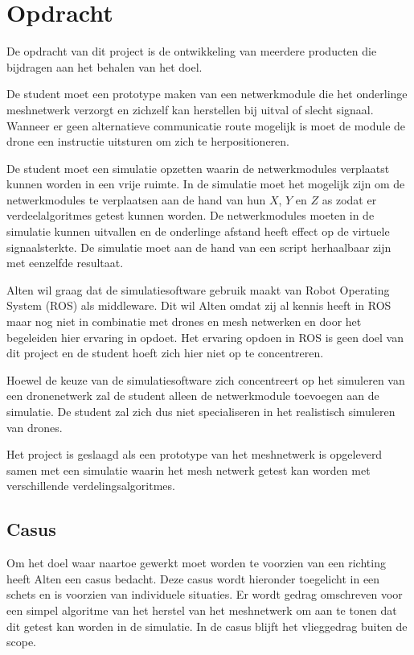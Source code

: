 \documentclass[a4paper, 11pt, oneside]{report}
\begin{document}
\section{Opdracht}\label{sec:opdracht}
De opdracht van dit project is de ontwikkeling van meerdere producten die bijdragen aan het behalen van het doel. 

De student moet een prototype maken van een netwerkmodule die het onderlinge meshnetwerk verzorgt en zichzelf kan herstellen bij uitval of slecht signaal.
Wanneer er geen alternatieve communicatie route mogelijk is moet de module de drone een instructie uitsturen om zich te herpositioneren.

De student moet een simulatie opzetten waarin de netwerkmodules verplaatst kunnen worden in een vrije ruimte. 
In de simulatie moet het mogelijk zijn om de netwerkmodules te verplaatsen aan de hand van hun $X$, $Y$ en $Z$ as zodat er verdeelalgoritmes getest kunnen worden.  
De netwerkmodules moeten in de simulatie kunnen uitvallen en de onderlinge afstand heeft effect op de virtuele signaalsterkte.
De simulatie moet aan de hand van een script herhaalbaar zijn met eenzelfde resultaat.

Alten wil graag dat de simulatiesoftware gebruik maakt van Robot Operating System (ROS) als middleware. 
Dit wil Alten omdat zij al kennis heeft in ROS maar nog niet in combinatie met drones en mesh netwerken en door het begeleiden hier ervaring in opdoet.
Het ervaring opdoen in ROS is geen doel van dit project en de student hoeft zich hier niet op te concentreren.

Hoewel de keuze van de simulatiesoftware zich concentreert op het simuleren van een dronenetwerk zal de student alleen de netwerkmodule toevoegen aan de simulatie. 
De student zal zich dus niet specialiseren in het realistisch simuleren van drones.

Het project is geslaagd als een prototype van het meshnetwerk is opgeleverd samen met een simulatie waarin het mesh netwerk getest kan worden met verschillende verdelingsalgoritmes.

\subsection{Casus}\label{sec:casus}
Om het doel waar naartoe gewerkt moet worden te voorzien van een richting heeft Alten een casus bedacht.
Deze casus wordt hieronder toegelicht in een schets en is voorzien van individuele situaties.
Er wordt gedrag omschreven voor een simpel algoritme van het herstel van het meshnetwerk om aan te tonen dat dit getest kan worden in de simulatie.
In de casus blijft het vlieggedrag buiten de scope.
\end{document}
